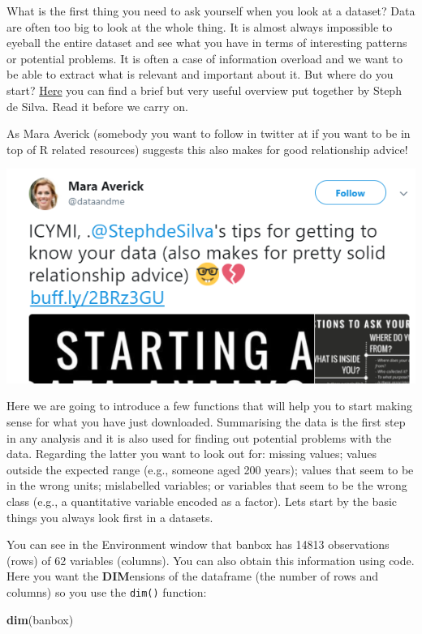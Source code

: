 \documentclass[]{book}
\newenvironment{Shaded}{\begin{snugshade}}{\end{snugshade}}
\newcommand{\KeywordTok}[1]{\textcolor[rgb]{0.13,0.29,0.53}{\textbf{#1}}}
\newcommand{\NormalTok}[1]{#1}
\theoremstyle{definition}
\theoremstyle{definition}
\theoremstyle{definition}
\theoremstyle{remark}
\begin{document}
What is the first thing you need to ask yourself when you look at a
dataset? Data are often too big to look at the whole thing. It is almost
always impossible to eyeball the entire dataset and see what you have in
terms of interesting patterns or potential problems. It is often a case
of information overload and we want to be able to extract what is
relevant and important about it. But where do you start?
\href{http://rex-analytics.com/data-analysis-questions-to-ask-the-first-time/}{Here}
you can find a brief but very useful overview put together by Steph de
Silva. Read it before we carry on.

As Mara Averick (somebody you want to follow in twitter at
\citet{dataanndme} if you want to be in top of R related resources)
suggests this also makes for good relationship advice!

\includegraphics{imgs/relationships.png}

Here we are going to introduce a few functions that will help you to
start making sense for what you have just downloaded. Summarising the
data is the first step in any analysis and it is also used for finding
out potential problems with the data. Regarding the latter you want to
look out for: missing values; values outside the expected range (e.g.,
someone aged 200 years); values that seem to be in the wrong units;
mislabelled variables; or variables that seem to be the wrong class
(e.g., a quantitative variable encoded as a factor). Lets start by the
basic things you always look first in a datasets.

You can see in the Environment window that banbox has 14813 observations
(rows) of 62 variables (columns). You can also obtain this information
using code. Here you want the \textbf{DIM}ensions of the dataframe (the
number of rows and columns) so you use the \texttt{dim()} function:

\begin{Shaded}
\begin{Highlighting}[]
\KeywordTok{dim}\NormalTok{(banbox)}
\end{Highlighting}
\end{Shaded}
\end{document}
